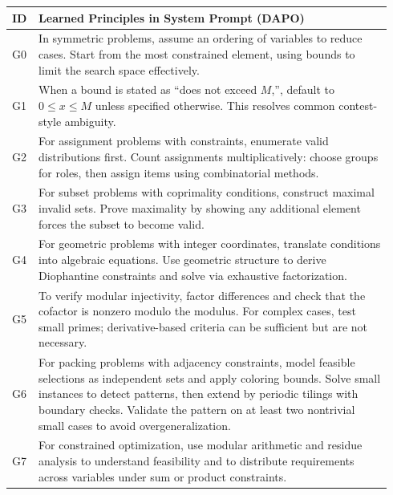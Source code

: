 \documentclass{article}
\theoremstyle{plain}
\theoremstyle{definition}
\theoremstyle{remark}
\begin{document}
\begin{table}[t]
\centering
\small
\setlength{\tabcolsep}{6pt}
\renewcommand{\arraystretch}{1.4}
\begin{tabular}{p{0.04\linewidth} p{0.9\linewidth}}
\toprule
\textbf{ID} & \textbf{Learned Principles in System Prompt (DAPO)} \\
\midrule
G0 & In symmetric problems, assume an ordering of variables to reduce cases. Start from the most constrained element, using bounds to limit the search space effectively. \\

G1 & When a bound is stated as ``does not exceed \(M\),'', default to \(0 \le x \le M\) unless specified otherwise. This resolves common contest-style ambiguity. \\

G2 & For assignment problems with constraints, enumerate valid distributions first. Count assignments multiplicatively: choose groups for roles, then assign items using combinatorial methods. \\

G3 & For subset problems with coprimality conditions, construct maximal invalid sets. Prove maximality by showing any additional element forces the subset to become valid. \\

G4 & For geometric problems with integer coordinates, translate conditions into algebraic equations. Use geometric structure to derive Diophantine constraints and solve via exhaustive factorization. \\

G5 & To verify modular injectivity, factor differences and check that the cofactor is nonzero modulo the modulus. For complex cases, test small primes; derivative-based criteria can be sufficient but are not necessary. \\

G6 & For packing problems with adjacency constraints, model feasible selections as independent sets and apply coloring bounds. Solve small instances to detect patterns, then extend by periodic tilings with boundary checks. Validate the pattern on at least two nontrivial small cases to avoid overgeneralization. \\

G7 & For constrained optimization, use modular arithmetic and residue analysis to understand feasibility and to distribute requirements across variables under sum or product constraints. \\


\end{tabular}
\end{table}
\end{document}
